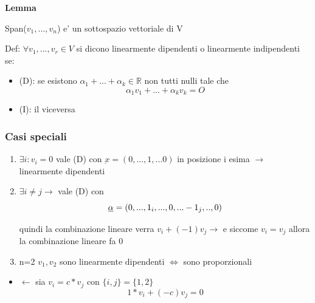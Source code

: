 \documentclass{article}
\begin{document}
\textbf{Lemma}
\begin{flushleft}
	Span($v_1,...,v_n$) e' un sottospazio vettoriale di V
\end{flushleft}
\begin{flushleft}
	Def: $\forall v_1,...,v_r \in V $ si dicono linearmente dipendenti o linearmente indipendenti se:
\end{flushleft}
\begin{itemize}
	\item (D): se esistono $\alpha_1 +...+\alpha_k \in \mathbb{R}$ non tutti nulli tale che
	      \begin{equation*}
		      \alpha_1 v_1+...+\alpha_k v_k = O
	      \end{equation*}
	\item (I): il viceversa
\end{itemize}
\subsubsection*{Casi speciali}
\begin{enumerate}
	\item $\exists i : v_i =0$ vale (D) con $\underbar{x} = (0,...,1,...0)$ in posizione i esima $\to$ linearmente dipendenti
	\item $\exists i \neq j \to$ vale (D) con
	      \begin{equation*}
		      \underbar{$\alpha$}=(0,...,1_i,...,0,...-1_j,..,0)
	      \end{equation*}
	      \begin{flushleft}
		      quindi la combinazione lineare verra $v_i+(-1)v_j \to $ e siccome $v_i=v_j$ allora la combinazione lineare fa 0
	      \end{flushleft}
	\item n=2 $v_1,v_2$ sono linearmente dipendenti $\iff$ sono proporzionali
\end{enumerate}
\begin{itemize}
	\item $\leftarrow$ sia $v_i=c*v_j$ con $\{ i,j \}=\{1,2\}$
	      \begin{equation*}
		      1*v_i+(-c)v_j=0
	      \end{equation*}

\end{itemize}
\end{document}
